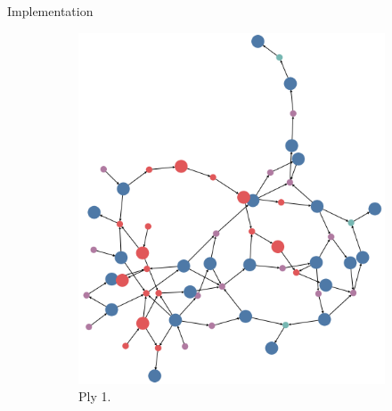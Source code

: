\documentclass[final]{beamer} %
\begin{document}
\begin{columns}
\begin{column}{.35\textwidth}
\begin{block}{Implementation}
		\begin{figure}[!htb]
			\centering
			\begin{subfigure}[!htb]{0.18\columnwidth}
				\centering
				\includegraphics[width=\columnwidth]{figures/knn_forward_think_1.png}
				\caption{Ply 1.}
			\end{subfigure}
			~
			\begin{subfigure}[!htb]{0.18\columnwidth}
				\centering

\end{subfigure}
\end{figure}
\end{block}
\end{column}
\end{columns}
\end{document}
